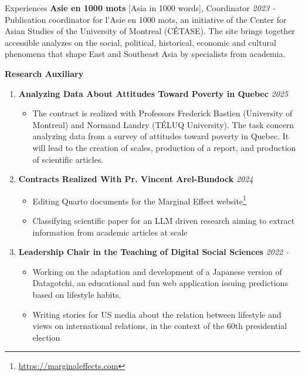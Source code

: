 \documentclass{resume} %
\begin{document}
\begin{rSection}{Experiences}
{\bf Asie en 1000 mots}{ [Asia in 1000 words], Coordinator} \hfill {\em 2023 - }\\
Publication coordinator for l'Asie en 1000 mots, an initiative of the Center for Asian Studies of the University of Montreal (CÉTASE). The site brings together accessible analyzes on the social, political, historical, economic and cultural phenomena that shape East and Southeast Asia by specialists from academia. 

\clearpage

{\bf Research Auxiliary}
\begin{enumerate}
    \item \textbf{Analyzing Data About Attitudes Toward Poverty in Quebec} \hfill {\em 2025}
        \begin{itemize}
            \item The contract is realized with Professors Frederick Bastien (University of Montreal) and Normand Landry (TÉLUQ University). The task concern analyzing data from a survey of attitudes toward poverty in Quebec. It will lead to the creation of scales, production of a report, and production of scientific articles. 
        \end{itemize}
    \item \textbf{Contracts Realized With Pr. Vincent Arel-Bundock} \hfill {\em 2024}
        \begin{itemize}
            \item Editing Quarto documents for the Marginal Effect website\footnote{\url{https://marginaleffects.com}}
            \item Classifying scientific paper for an LLM driven research aiming to extract information from academic articles at scale
        \end{itemize}
    \item \textbf{Leadership Chair in the Teaching of Digital Social Sciences} \hfill {\em 2022 -}
        \begin{itemize}
            \item {Working on the adaptation and development of a Japanese version of Datagotchi, an educational and fun web application issuing predictions based on lifestyle habits.}
            \item Writing stories for US media about the relation between lifestyle and views on international relations, in the context of the 60th presidential election 

\end{itemize}
\end{enumerate}
\end{rSection}
\end{document}
